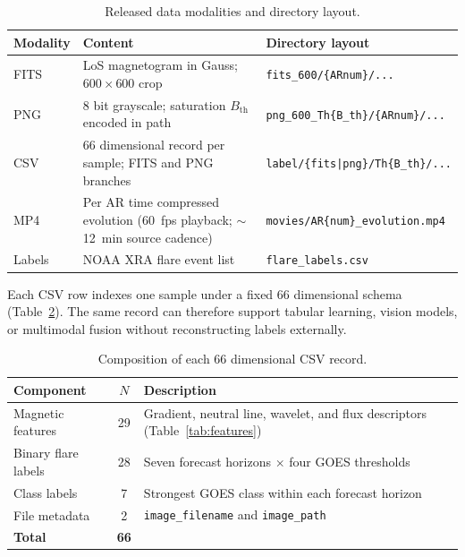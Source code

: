 \documentclass[universe,article,submit,moreauthors]{Definitions/mdpi}
\begin{document}
\begin{table}[H]
\caption{Released data modalities and directory layout.}
\label{tab:modalities}
\centering
\small
\begin{tabularx}{\textwidth}{@{}>{\raggedright\arraybackslash}p{1.8cm}X>{\raggedright\arraybackslash}p{4.6cm}@{}}
\toprule
\textbf{Modality} & \textbf{Content} & \textbf{Directory layout} \\
\midrule
FITS & LoS magnetogram in Gauss; $600\times600$ crop & \texttt{fits\_600/\{ARnum\}/...} \\
PNG & 8 bit grayscale; saturation $B_{\mathrm{th}}$ encoded in path & \texttt{png\_600\_Th\{B\_th\}/\{ARnum\}/...} \\
CSV & 66 dimensional record per sample; FITS and PNG branches & \texttt{label/\{fits|png\}/Th\{B\_th\}/...} \\
MP4 & Per AR time compressed evolution (60~fps playback; $\sim$12~min source cadence) & \texttt{movies/AR\{num\}\_evolution.mp4} \\
Labels & NOAA XRA flare event list & \texttt{flare\_labels.csv} \\
\bottomrule
\end{tabularx}
\end{table}

Each CSV row indexes one sample under a fixed 66 dimensional schema (Table~\ref{tab:schema}). The same record can therefore support tabular learning, vision models, or multimodal fusion without reconstructing labels externally.

\begin{table}[H]
\caption{Composition of each 66 dimensional CSV record.}
\label{tab:schema}
\centering
\small
\begin{tabularx}{\textwidth}{@{}>{\raggedright\arraybackslash}p{2.8cm}c>{\raggedright\arraybackslash}X@{}}
\toprule
\textbf{Component} & \textbf{$N$} & \textbf{Description} \\
\midrule
Magnetic features & 29 & Gradient, neutral line, wavelet, and flux descriptors (Table~\ref{tab:features}) \\
Binary flare labels & 28 & Seven forecast horizons $\times$ four GOES thresholds \\
Class labels & 7 & Strongest GOES class within each forecast horizon \\
File metadata & 2 & \texttt{image\_filename} and \texttt{image\_path} \\
\midrule
\textbf{Total} & \textbf{66} & \\
\bottomrule
\end{tabularx}
\end{table}
\end{document}
